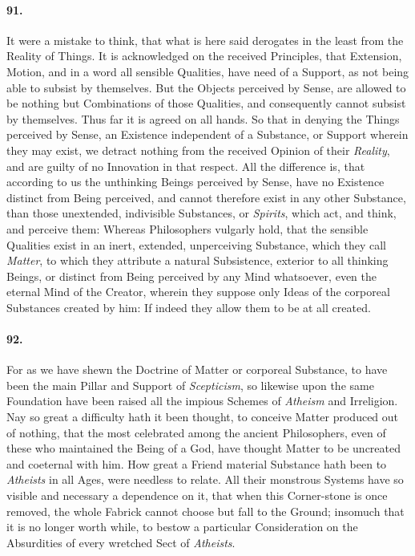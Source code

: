 \documentclass[]{article}
\newenvironment{sectionbody}{}{}
\begin{document}
\begin{sectionbody}
\paragraph{91.} It were a mistake to think, that what is here said derogates in
the least from the Reality of Things.  It is acknowledged on the
received Principles, that Extension, Motion, and in a word all
sensible Qualities, have need of a Support, as not being able to
subsist by themselves.  But the Objects perceived by Sense, are
allowed to be nothing but Combinations of those Qualities, and
consequently cannot subsist by themselves.  Thus far it is agreed
on all hands.  So that in denying the Things perceived by Sense,
an Existence independent of a Substance, or Support wherein they
may exist, we detract nothing from the received Opinion of their
\emph{Reality}, and are guilty of no Innovation in that
respect.  All the difference is, that according to us the
unthinking Beings perceived by Sense, have no Existence distinct
from Being perceived, and cannot therefore exist in any other
Substance, than those unextended, indivisible Substances, or
\emph{Spirits}, which act, and think, and perceive them: Whereas
Philosophers vulgarly hold, that the sensible Qualities exist in
an inert, extended, unperceiving Substance, which they call
\emph{Matter}, to which they attribute a natural Subsistence,
exterior to all thinking Beings, or distinct from Being perceived
by any Mind whatsoever, even the eternal Mind of the {\sc Creator},
wherein they suppose only Ideas of the corporeal Substances
created by him: If indeed they allow them to be at all created.



\paragraph{92.} For as we have shewn the Doctrine of Matter or corporeal
Substance, to have been the main Pillar and Support of
\emph{Scepticism}, so likewise upon the same Foundation have
been raised all the impious Schemes of \emph{Atheism} and
Irreligion.  Nay so great a difficulty hath it been thought, to
conceive Matter produced out of nothing, that the most celebrated
among the ancient Philosophers, even of these who maintained the
Being of a {\sc God}, have thought Matter to be uncreated and coeternal
with him.  How great a Friend material Substance hath been to
\emph{Atheists} in all Ages, were needless to relate.  All
their monstrous Systems have so visible and necessary a
dependence on it, that when this Corner-stone is once removed,
the whole Fabrick cannot choose but fall to the Ground; insomuch
that it is no longer worth while, to bestow a particular
Consideration on the Absurdities of every wretched Sect of
\emph{Atheists}.




\end{sectionbody}
\end{document}
